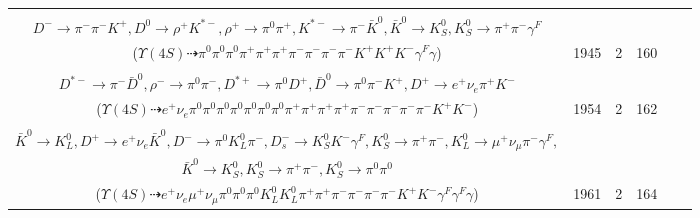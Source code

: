 \documentclass[landscape]{article}
\newcounter{rownumbers}
\newcommand\rn{\stepcounter{rownumbers}\arabic{rownumbers}}
\newcommand{\EOLP}{\\ \hline} %
\newcommand{\topoTags}[1]{#1} %
\begin{document}
\begin{longtable}{clcccc}
\rn & \makecell[l]{ $ 
\Upsilon(4S) \rightarrow B^{0} \bar{B}^{0} ,
B^{0} \rightarrow K^{+} D^{*-} D^{*0} ,
\bar{B}^{0} \rightarrow \pi^{0} \bar{K}_0^{*0} ,
D^{*-} \rightarrow \pi^{0} D^{-} ,
D^{*0} \rightarrow D^{0} \gamma ,
\bar{K}_0^{*0} \rightarrow \pi^{+} K^{-} ,
$ \\ $
D^{-} \rightarrow \pi^{-} \pi^{-} K^{+} ,
D^{0} \rightarrow \rho^{+} K^{*-} ,
\rho^{+} \rightarrow \pi^{0} \pi^{+} ,
K^{*-} \rightarrow \pi^{-} \bar{K}^{0} ,
\bar{K}^{0} \rightarrow K_{S}^{0} ,
K_{S}^{0} \rightarrow \pi^{+} \pi^{-} \gamma^{F} 
$ \\ ($
\Upsilon(4S) \dashrightarrow \pi^{0} \pi^{0} \pi^{0} \pi^{+} \pi^{+} \pi^{+} \pi^{-} \pi^{-} \pi^{-} \pi^{-} K^{+} K^{+} K^{-} \gamma^{F} \gamma 
$) } & \topoTags{1945 & }2 & 160 \EOLP

\rn & \makecell[l]{ $ 
\Upsilon(4S) \rightarrow B^{0} \bar{B}^{0} ,
B^{0} \rightarrow \pi^{0} \pi^{0} \rho^{0} \rho^{+} \eta D^{*-} ,
\bar{B}^{0} \rightarrow \rho^{-} D^{*+} ,
\rho^{0} \rightarrow \pi^{+} \pi^{-} ,
\rho^{+} \rightarrow \pi^{0} \pi^{+} ,
\eta \rightarrow \pi^{0} \pi^{+} \pi^{-} ,
$ \\ $
D^{*-} \rightarrow \pi^{-} \bar{D}^{0} ,
\rho^{-} \rightarrow \pi^{0} \pi^{-} ,
D^{*+} \rightarrow \pi^{0} D^{+} ,
\bar{D}^{0} \rightarrow \pi^{0} \pi^{-} K^{+} ,
D^{+} \rightarrow e^{+} \nu_{e} \pi^{+} K^{-} 
$ \\ ($
\Upsilon(4S) \dashrightarrow e^{+} \nu_{e} \pi^{0} \pi^{0} \pi^{0} \pi^{0} \pi^{0} \pi^{0} \pi^{0} \pi^{+} \pi^{+} \pi^{+} \pi^{+} \pi^{-} \pi^{-} \pi^{-} \pi^{-} \pi^{-} K^{+} K^{-} 
$) } & \topoTags{1954 & }2 & 162 \EOLP

\rn & \makecell[l]{ $ 
\Upsilon(4S) \rightarrow B^{0} B^{0} ,
B^{0} \rightarrow K^{+} D_{s}^{*-} ,
B^{0} \rightarrow K^{0} K^{0} \bar{K}^{0} D^{+} D^{-} ,
D_{s}^{*-} \rightarrow D_{s}^{-} \gamma ,
K^{0} \rightarrow K_{L}^{0} ,
K^{0} \rightarrow K_{S}^{0} ,
$ \\ $
\bar{K}^{0} \rightarrow K_{L}^{0} ,
D^{+} \rightarrow e^{+} \nu_{e} \bar{K}^{0} ,
D^{-} \rightarrow \pi^{0} K_{L}^{0} \pi^{-} ,
D_{s}^{-} \rightarrow K_{S}^{0} K^{-} \gamma^{F} ,
K_{S}^{0} \rightarrow \pi^{+} \pi^{-} ,
K_{L}^{0} \rightarrow \mu^{+} \nu_{\mu} \pi^{-} \gamma^{F} ,
$ \\ $
\bar{K}^{0} \rightarrow K_{S}^{0} ,
K_{S}^{0} \rightarrow \pi^{+} \pi^{-} ,
K_{S}^{0} \rightarrow \pi^{0} \pi^{0} 
$ \\ ($
\Upsilon(4S) \dashrightarrow e^{+} \nu_{e} \mu^{+} \nu_{\mu} \pi^{0} \pi^{0} \pi^{0} K_{L}^{0} K_{L}^{0} \pi^{+} \pi^{+} \pi^{-} \pi^{-} \pi^{-} \pi^{-} K^{+} K^{-} \gamma^{F} \gamma^{F} \gamma 
$) } & \topoTags{1961 & }2 & 164 \EOLP


\end{longtable}
\end{document}
